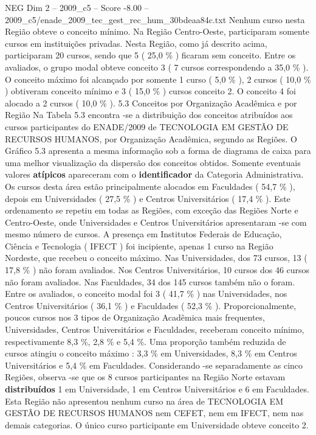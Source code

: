 \begin{textsample}{NEG Dim 2 – 2009\_c5 – Score -8.00 – 2009\_c5/enade\_2009\_tec\_gest\_rec\_hum\_30bdeaa84c.txt}
Nenhum curso nesta Região obteve o conceito mínimo.
Na Região Centro-Oeste, participaram somente cursos em instituições privadas.
Nesta Região, como já descrito acima, participaram 20 cursos, sendo que 5 ( 25,0 \% ) ficaram sem conceito.
Entre os avaliados, o grupo modal obteve conceito 3 ( 7 cursos correspondendo a 35,0 \% ).
O conceito máximo foi alcançado por somente 1 curso ( 5,0 \% ), 2 cursos ( 10,0 \% ) obtiveram conceito mínimo e 3 ( 15,0 \% ) cursos conceito 2.
O conceito 4 foi alocado a 2 cursos ( 10,0 \% ). 5.3 Conceitos por Organização Acadêmica e por Região Na Tabela 5.3 encontra -se a distribuição dos conceitos atribuídos aos cursos participantes do ENADE/2009 de TECNOLOGIA EM GESTÃO DE RECURSOS HUMANOS, por Organização Acadêmica, segundo as Regiões.
O Gráfico 5.3 apresenta a mesma informação sob a forma de diagrama de caixa para uma melhor visualização da dispersão dos conceitos obtidos.
Somente eventuais valores \textbf{atípicos} apareceram com o \textbf{identificador} da Categoria Administrativa.
Os cursos desta área estão principalmente alocados em Faculdades ( 54,7 \% ), depois em Universidades ( 27,5 \% ) e Centros Universitários ( 17,4 \% ).
Este ordenamento se repetiu em todas as Regiões, com exceção das Regiões Norte e Centro-Oeste, onde Universidades e Centros Universitários apresentaram -se com mesmo número de cursos.
A presença em Institutos Federais de Educação, Ciência e Tecnologia ( IFECT ) foi incipiente, apenas 1 curso na Região Nordeste, que recebeu o conceito máximo.
Nas Universidades, dos 73 cursos, 13 ( 17,8 \% ) não foram avaliados.
Nos Centros Universitários, 10 cursos dos 46 cursos não foram avaliados.
Nas Faculdades, 34 dos 145 cursos também não o foram.
Entre os avaliados, o conceito modal foi 3 ( 41,7 \% ) nas Universidades, nos Centros Universitários ( 36,1 \% ) e Faculdades ( 52,3 \% ).
Proporcionalmente, poucos cursos nos 3 tipos de Organização Acadêmica mais frequentes, Universidades, Centros Universitários e Faculdades, receberam conceito mínimo, respectivamente 8,3 \%, 2,8 \% e 5,4 \%.
Uma proporção também reduzida de cursos atingiu o conceito máximo : 3,3 \% em Universidades, 8,3 \% em Centros Universitários e 5,4 \% em Faculdades.
Considerando -se separadamente as cinco Regiões, observa -se que os 8 cursos participantes na Região Norte estavam \textbf{distribuídos} 1 em Universidade, 1 em Centros Universitários e 6 em Faculdades.
Esta Região não apresentou nenhum curso na área de TECNOLOGIA EM GESTÃO DE RECURSOS HUMANOS nem CEFET, nem em IFECT, nem nas demais categorias.
O único curso participante em Universidade obteve conceito 2.

\end{textsample}
